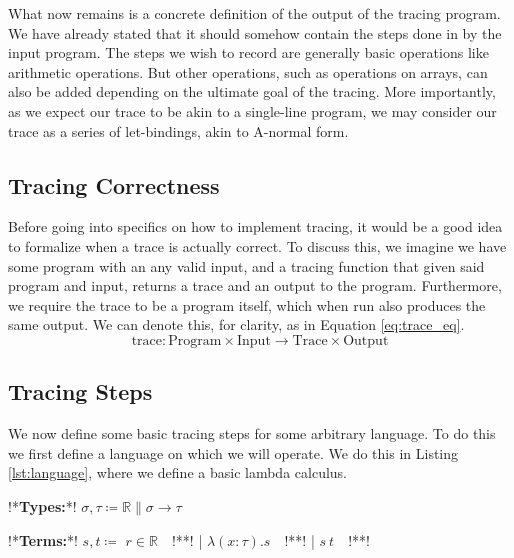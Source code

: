    What now remains is a concrete definition of the output of the tracing program.
    We have already stated that it should somehow contain the steps done in by the input program.
    The steps we wish to record are generally basic operations like arithmetic operations.
    But other operations, such as operations on arrays, can also be added depending on the ultimate goal of the tracing.
    More importantly, as we expect our trace to be akin to a single-line program, we may consider our trace as a series of let-bindings, akin to A-normal form\cn.
    
    \subsection{Tracing Correctness} \label{sec:correctness}
        Before going into specifics on how to implement tracing, it would be a good idea to formalize when a trace is actually correct.
        To discuss this, we imagine we have some program with an any valid input, and a tracing function that given said program and input, returns a trace and an output to the program.
        Furthermore, we require the trace to be a program itself, which when run also produces the same output.
        We can denote this, for clarity, as in Equation \ref{eq:trace_eq}.
        \begin{equation}
            \label{eq:trace_eq}
            \text{trace}:\text{Program}\times\text{Input}\rightarrow\text{Trace}\times\text{Output}
        \end{equation}

    \subsection{Tracing Steps} \label{sec:steps}
        We now define some basic tracing steps for some arbitrary language.
        To do this we first define a language on which we will operate.
        We do this in Listing \ref{lst:language}, where we define a basic lambda calculus.

        \begin{quicklst}[caption=Basic language, label=lst:language, gobble=12]
            !*\textbf{Types:}*!
                $\sigma,\tau\coloneqq\mathbb{R}\|\sigma\to\tau$

            !*\textbf{Terms:}*!
                $s,t\coloneqq$
                    $r\in\mathbb{R}\quad$!**!
                  | $\lambda(x:\tau).s\quad$!**!
                  | $s\ t\quad$!**!
        \end{quicklst}

